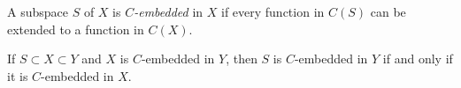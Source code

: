 A subspace $S$ of $X$ is \emph{$C$-embedded} in $X$ if every function in $C(S)$ can be extended to a function in $C(X)$.

If $S \subset X \subset Y$ and $X$ is $C$-embedded in $Y$, then $S$ is $C$-embedded in $Y$ if and only if it is $C$-embedded in $X$.
